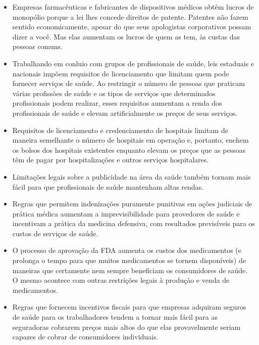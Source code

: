 \begin{itemize}
\item Empresas farmacêuticas e fabricantes de dispositivos médicos obtêm lucros de monopólio porque a lei lhes concede direitos de patente. Patentes não fazem sentido economicamente, apesar do que seus apologistas corporativos possam dizer a você. Mas elas aumentam os lucros de quem as tem, às custas das pessoas comuns.

\item Trabalhando em conluio com grupos de profissionais de saúde, leis estaduais e nacionais impõem requisitos de licenciamento que limitam quem pode fornecer serviços de saúde. Ao restringir o número de pessoas que praticam várias profissões de saúde e os tipos de serviços que determinados profissionais podem realizar, esses requisitos aumentam a renda dos profissionais de saúde e elevam artificialmente os preços de seus serviços.

\item Requisitos de licenciamento e credenciamento de hospitais limitam de maneira semelhante o número de hospitais em operação e, portanto, enchem os bolsos dos hospitais existentes enquanto elevam os preços que as pessoas têm de pagar por hospitalizações e outros serviços hospitalares.

\item Limitações legais sobre a publicidade na área da saúde também tornam mais fácil para que profissionais de saúde mantenham altas rendas.

\item Regras que permitem indenizações puramente punitivas em ações judiciais de prática médica aumentam a imprevisibilidade para provedores de saúde e incentivam a prática da medicina defensiva, com resultados previsíveis para os custos de serviços de saúde.

\item O processo de aprovação da FDA aumenta os custos dos medicamentos (e prolonga o tempo para que muitos medicamentos se tornem disponíveis) de maneiras que certamente nem sempre beneficiam os consumidores de saúde. O mesmo acontece com outras restrições legais à produção e venda de medicamentos.

\item Regras que fornecem incentivos fiscais para que empresas adquiram seguros de saúde para os trabalhadores tendem a tornar mais fácil para as seguradoras cobrarem preços mais altos do que elas provavelmente seriam capazes de cobrar de consumidores individuais.


\end{itemize}

